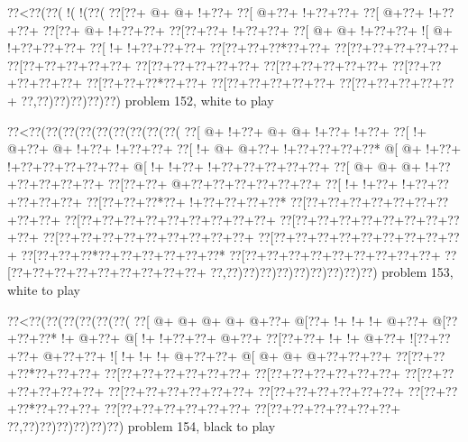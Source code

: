 \vbox{\vbox{\goo
\0??<\0??(\0??(\- !(\- !(\0??(
\0??[\0??+\- @+\- @+\- !+\0??+
\0??[\- @+\0??+\- !+\0??+\0??+
\0??[\- @+\0??+\- !+\0??+\0??+
\0??[\0??+\- @+\- !+\0??+\0??+
\0??[\0??+\0??+\- !+\0??+\0??+
\0??[\- @+\- @+\- !+\0??+\0??+
\- ![\- @+\- !+\0??+\0??+\0??+
\0??[\- !+\- !+\0??+\0??+\0??+
\0??[\0??+\0??+\0??*\0??+\0??+
\0??[\0??+\0??+\0??+\0??+\0??+
\0??[\0??+\0??+\0??+\0??+\0??+
\0??[\0??+\0??+\0??+\0??+\0??+
\0??[\0??+\0??+\0??+\0??+\0??+
\0??[\0??+\0??+\0??+\0??+\0??+
\0??[\0??+\0??+\0??*\0??+\0??+
\0??[\0??+\0??+\0??+\0??+\0??+
\0??[\0??+\0??+\0??+\0??+\0??+
\0??,\0??)\0??)\0??)\0??)\0??)
}
\hfil problem 152, white to play\hfil\break
}

\vbox{\vbox{\goo
\0??<\0??(\0??(\0??(\0??(\0??(\0??(\0??(\0??(\0??(
\0??[\- @+\- !+\0??+\- @+\- @+\- !+\0??+\- !+\0??+
\0??[\- !+\- @+\0??+\- @+\- !+\0??+\- !+\0??+\0??+
\0??[\- !+\- @+\- @+\0??+\- !+\0??+\0??+\0??+\0??*
\- @[\- @+\- !+\0??+\- !+\0??+\0??+\0??+\0??+\0??+
\- @[\- !+\- !+\0??+\- !+\0??+\0??+\0??+\0??+\0??+
\0??[\- @+\- @+\- @+\- !+\0??+\0??+\0??+\0??+\0??+
\0??[\0??+\0??+\- @+\0??+\0??+\0??+\0??+\0??+\0??+
\0??[\- !+\- !+\0??+\- !+\0??+\0??+\0??+\0??+\0??+
\0??[\0??+\0??+\0??*\0??+\- !+\0??+\0??+\0??+\0??*
\0??[\0??+\0??+\0??+\0??+\0??+\0??+\0??+\0??+\0??+
\0??[\0??+\0??+\0??+\0??+\0??+\0??+\0??+\0??+\0??+
\0??[\0??+\0??+\0??+\0??+\0??+\0??+\0??+\0??+\0??+
\0??[\0??+\0??+\0??+\0??+\0??+\0??+\0??+\0??+\0??+
\0??[\0??+\0??+\0??+\0??+\0??+\0??+\0??+\0??+\0??+
\0??[\0??+\0??+\0??*\0??+\0??+\0??+\0??+\0??+\0??*
\0??[\0??+\0??+\0??+\0??+\0??+\0??+\0??+\0??+\0??+
\0??[\0??+\0??+\0??+\0??+\0??+\0??+\0??+\0??+\0??+
\0??,\0??)\0??)\0??)\0??)\0??)\0??)\0??)\0??)\0??)
}
\hfil problem 153, white to play\hfil\break
}

\vbox{\vbox{\goo
\0??<\0??(\0??(\0??(\0??(\0??(\0??(
\0??[\- @+\- @+\- @+\- @+\- @+\0??+
\- @[\0??+\- !+\- !+\- !+\- @+\0??+
\- @[\0??+\0??+\0??*\- !+\- @+\0??+
\- @[\- !+\- !+\0??+\0??+\- @+\0??+
\0??[\0??+\0??+\- !+\- !+\- @+\0??+
\- ![\0??+\0??+\0??+\- @+\0??+\0??+
\- ![\- !+\- !+\- !+\- @+\0??+\0??+
\- @[\- @+\- @+\- @+\0??+\0??+\0??+
\0??[\0??+\0??+\0??*\0??+\0??+\0??+
\0??[\0??+\0??+\0??+\0??+\0??+\0??+
\0??[\0??+\0??+\0??+\0??+\0??+\0??+
\0??[\0??+\0??+\0??+\0??+\0??+\0??+
\0??[\0??+\0??+\0??+\0??+\0??+\0??+
\0??[\0??+\0??+\0??+\0??+\0??+\0??+
\0??[\0??+\0??+\0??*\0??+\0??+\0??+
\0??[\0??+\0??+\0??+\0??+\0??+\0??+
\0??[\0??+\0??+\0??+\0??+\0??+\0??+
\0??,\0??)\0??)\0??)\0??)\0??)\0??)
}
\hfil problem 154, black to play\hfil\break
}

